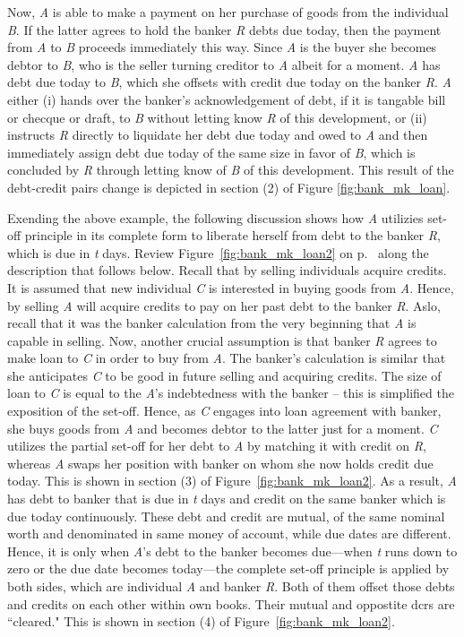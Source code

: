 Now, \textit{A} is able to make a payment on her purchase of goods from the individual \textit{B}. If the latter agrees to hold the banker \textit{R} debts due today, then the payment from \textit{A} to \textit{B} proceeds immediately this way. Since \textit{A} is the buyer she becomes debtor to \textit{B}, who is the seller turning creditor to \textit{A} albeit for a moment. \textit{A} has debt due today to \textit{B}, which she offsets with credit due today on the banker \textit{R}. \textit{A} either (i) hands over the banker's acknowledgement of debt, if it is tangable bill or checque or draft, to \textit{B} without letting know \textit{R} of this development, or (ii) instructs \textit{R} directly to liquidate her debt due today and owed to \textit{A} and then immediately assign debt due today of the same size in favor of \textit{B}, which is concluded by \textit{R} through letting know of \textit{B} of this development. This result of the debt-credit pairs change is depicted in section (2) of Figure \ref{fig:bank_mk_loan}.

Exending the above example, the following discussion shows how \textit{A} utilizies set-off principle in its complete form to liberate herself from debt to the banker \textit{R}, which is due in \textit{t} days. Review Figure~\ref{fig:bank_mk_loan2} on p.~\pageref{fig:bank_mk_loan2} along the description that follows below. Recall that by selling individuals acquire credits. It is assumed that new individual \textit{C} is interested in buying goods from \textit{A}. Hence, by selling \textit{A} will acquire credits to pay on her past debt to the banker \textit{R}. Aslo, recall that it was the banker calculation from the very beginning that \textit{A} is capable in selling. Now, another crucial assumption is that banker \textit{R} agrees to make loan to \textit{C} in order to buy from \textit{A}. The banker's calculation is similar that she anticipates \textit{C} to be good in future selling and acquiring credits. The size of loan to \textit{C} is equal to the \textit{A}'s indebtedness with the banker -- this is simplified the exposition of the set-off. Hence, as \textit{C} engages into loan agreement with banker, she buys goods from \textit{A} and becomes debtor to the latter just for a moment. \textit{C} utilizes the partial set-off for her debt to \textit{A} by matching it with credit on \textit{R}, whereas \textit{A} swaps her position with banker on whom she now holds credit due today. This is shown in section (3) of Figure~\ref{fig:bank_mk_loan2}. As a result, \textit{A} has debt to banker that is due in \textit{t} days and credit on the same banker which is due today continuously. These debt and credit are mutual, of the same nominal worth and denominated in same money of account, while due dates are different. Hence, it is only when \textit{A}'s debt to the banker becomes due---when \textit{t} runs down to zero or the due date becomes today---the complete set-off principle is applied by both sides, which are individual \textit{A} and banker \textit{R}. Both of them offset those debts and credits on each other within own books. Their mutual and oppostite \acp{dcr} are ``cleared." This is shown in section (4) of Figure~\ref{fig:bank_mk_loan2}.

